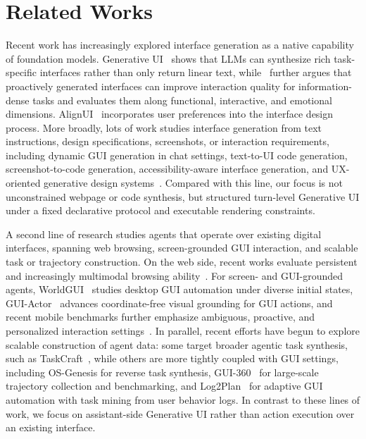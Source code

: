 \section{Related Works}

Recent work has increasingly explored interface generation as a native capability of foundation models. Generative UI~\citep{leviathan2025generative} shows that LLMs can synthesize rich task-specific interfaces rather than only return linear text, while~\citet{chen2025generative} further argues that proactively generated interfaces can improve interaction quality for information-dense tasks and evaluates them along functional, interactive, and emotional dimensions. AlignUI~\citep{liu2026alignui} incorporates user preferences into the interface design process. More broadly, lots of work studies interface generation from text instructions, design specifications, screenshots, or interaction requirements, including dynamic GUI generation in chat settings, text-to-UI code generation, screenshot-to-code generation, accessibility-aware interface generation, and UX-oriented generative design systems~\citep{wu2024uicoder, si2025design2code, yoon2025a11yn, chen2025genui}. Compared with this line, our focus is not unconstrained webpage or code synthesis, but structured turn-level Generative UI under a fixed declarative protocol and executable rendering constraints.

A second line of research studies agents that operate over existing digital interfaces, spanning web browsing, screen-grounded GUI interaction, and scalable task or trajectory construction. On the web side, recent works evaluate persistent and increasingly multimodal browsing ability~\citep{zhang2026browsecomp, li2025mm}. For screen- and GUI-grounded agents, WorldGUI~\citep{zhao2025worldgui} studies desktop GUI automation under diverse initial states, GUI-Actor~\cite{wu2025gui} advances coordinate-free visual grounding for GUI actions, and recent mobile benchmarks further emphasize ambiguous, proactive, and personalized interaction settings~\citep{sun2026ambibench, yang2025fingertip}. In parallel, recent efforts have begun to explore scalable construction of agent data: some target broader agentic task synthesis, such as TaskCraft~\citep{shi2025taskcraft}, while others are more tightly coupled with GUI settings, including OS-Genesis for reverse task synthesis, GUI-360~\citep{mu2025gui} for large-scale trajectory collection and benchmarking, and Log2Plan~\citep{lee2025log2plan} for adaptive GUI automation with task mining from user behavior logs. In contrast to these lines of work, we focus on assistant-side Generative UI rather than action execution over an existing interface.


